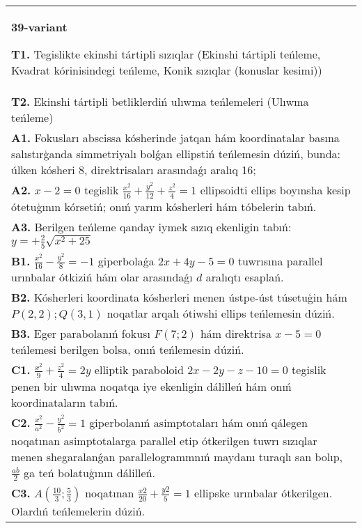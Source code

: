 \documentclass{article}
\begin{document}
\begin{tabular}{m{17cm}}
\textbf{39-variant}
\newline

\textbf{T1.} Tegislikte ekinshi tártipli sızıqlar (Ekinshi tártipli teńleme, Kvadrat kórinisindegi teńleme, Konik sızıqlar (konuslar kesimi)) \\
\textbf{T2.} Ekinshi tártipli betliklerdiń ulıwma teńlemeleri (Ulıwma teńleme) \\
\textbf{A1.} Fokusları abscissa kósherinde jatqan hám koordinatalar basına salıstırģanda simmetriyalı bolǵan ellipstiń teńlemesin dúziń, bunda: úlken kósheri 8, direktrisaları arasındaǵı aralıq 16; \\
\textbf{A2.} $x-2=0$ tegislik $\frac{x^2}{16}+\frac{y^2}{12}+\frac{z^2}{4}=1$ ellipsoidti ellips boyınsha kesip ótetuģının kórsetiń; onıń yarım kósherleri hám tóbelerin tabıń. \\
\textbf{A3.} Berilgen teńleme qanday iymek sızıq ekenligin tabıń: $y=+\frac{2}{5} \sqrt{x^2+25}$ \\
\textbf{B1.} $\frac{x^2}{16}-\frac{y^2}{8}=-1$ giperbolaǵa $2 x+4 y-5=0$ tuwrısına parallel urınbalar ótkiziń hám olar arasındaǵı $d$ aralıqtı esaplań. \\
\textbf{B2.} Kósherleri koordinata kósherleri menen ústpe-úst túsetuģin hám $P (2,2); Q (3,1) $ noqatlar arqalı ótiwshi ellips teńlemesin dúziń. \\
\textbf{B3.} Eger parabolanıń fokusı $F (7; 2) $ hám direktrisa $x-5=0$ teńlemesi berilgen bolsa, onıń teńlemesin dúziń. \\
\textbf{C1.} $\frac{x^2}{9}+\frac{z^2}{4}=2 y$ elliptik paraboloid $2 x-2 y-z-10=0$ tegislik penen bir ulıwma noqatqa iye ekenligin dálilleń hám onıń koordinataların tabıń. \\
\textbf{C2.} $\frac{x^2}{a^2}-\frac{y^2}{b^2}=1$ giperbolanıń asimptotaları hám onıń qálegen noqatınan asimptotalarga parallel etip ótkerilgen tuwrı sızıqlar menen shegaralanǵan parallelogrammnıń maydanı turaqlı san bolıp, $\frac{a b}{2}$ ga teń bolatuģının dálilleń. \\
\textbf{C3.} $A\left(\frac{10}{3}; \frac{5}{3}\right)$ noqatınan $\frac{x2}{20}+\frac{y2}{5}=1$ ellipske urınbalar ótkerilgen. Olardıń teńlemelerin dúziń. \\

\end{tabular}
\vspace{1cm}
\end{document}
